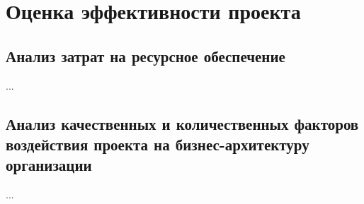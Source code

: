 \documentclass[../thesis.tex]{subfiles}
\begin{document}
\section{Оценка эффективности проекта}
\subsection{Анализ затрат на ресурсное обеспечение}

...



\subsection{Анализ качественных и количественных факторов воздействия проекта на бизнес-архитектуру организации}

...
\end{document}
